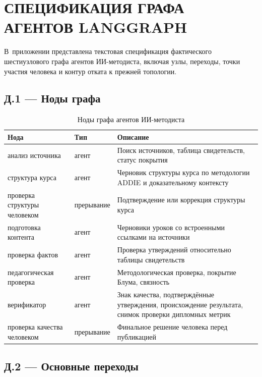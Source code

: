 \chapter{СПЕЦИФИКАЦИЯ ГРАФА АГЕНТОВ LANGGRAPH}

В~приложении представлена текстовая спецификация фактического
шестиузлового графа агентов ИИ-методиста, включая узлы, переходы, точки участия
человека и контур отката к прежней топологии.

\section*{Д.1 — Ноды графа}

\begin{table}[H]
  \caption{Ноды графа агентов ИИ-методиста}
  \label{tab:langgraph-nodes}
  \centering
  {\small
  \setlength{\tabcolsep}{3pt}
  \renewcommand{\arraystretch}{1.12}
  \begin{tabular}{|P{3.9cm}|P{2.2cm}|P{6.2cm}|}
  \hline
  \textbf{Нода} & \textbf{Тип} & \textbf{Описание} \\
  \hline
  анализ источника & агент & Поиск источников, таблица свидетельств, статус покрытия \\
  \hline
  структура курса & агент & Черновик структуры курса по методологии ADDIE и доказательному контексту \\
  \hline
  проверка структуры человеком & прерывание & Подтверждение или коррекция структуры курса \\
  \hline
  подготовка контента & агент & Черновики уроков со встроенными ссылками на источники \\
  \hline
  проверка фактов & агент & Проверка утверждений относительно таблицы свидетельств \\
  \hline
  педагогическая проверка & агент & Методологическая проверка, покрытие Блума, связность \\
  \hline
  верификатор & агент & Знак качества, подтверждённые утверждения, происхождение результата, снимок проверки дипломных метрик \\
  \hline
  проверка качества человеком & прерывание & Финальное решение человека перед публикацией \\
  \hline
  \end{tabular}
  }
\end{table}

\section*{Д.2 — Основные переходы}

